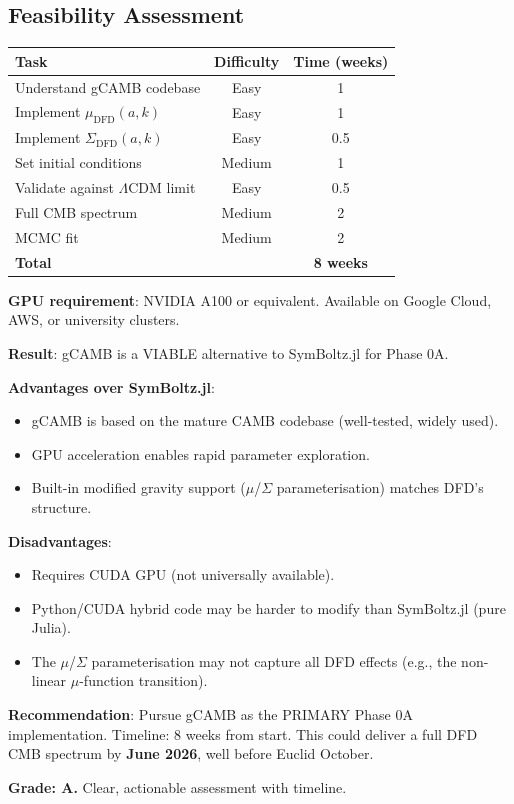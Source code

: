 \documentclass[11pt,a4paper]{article}
\begin{document}
\subsection{Feasibility Assessment}

\begin{center}
\begin{tabular}{lcc}
\toprule
\textbf{Task} & \textbf{Difficulty} & \textbf{Time (weeks)} \\
\midrule
Understand gCAMB codebase & Easy & 1 \\
Implement $\mu_{\mathrm{DFD}}(a,k)$ & Easy & 1 \\
Implement $\Sigma_{\mathrm{DFD}}(a,k)$ & Easy & 0.5 \\
Set initial conditions & Medium & 1 \\
Validate against $\Lambda$CDM limit & Easy & 0.5 \\
Full CMB spectrum & Medium & 2 \\
MCMC fit & Medium & 2 \\
\midrule
\textbf{Total} & & \textbf{8 weeks} \\
\bottomrule
\end{tabular}
\end{center}

\textbf{GPU requirement}: NVIDIA A100 or equivalent. Available on Google Cloud, AWS, or university clusters.

\begin{tcolorbox}[colback=green!5!white, colframe=green!60!black, title={Agent 16: gCAMB Assessment}]
\textbf{Result}: gCAMB is a VIABLE alternative to SymBoltz.jl for Phase 0A.

\textbf{Advantages over SymBoltz.jl}:
\begin{itemize}
\item gCAMB is based on the mature CAMB codebase (well-tested, widely used).
\item GPU acceleration enables rapid parameter exploration.
\item Built-in modified gravity support ($\mu$/$\Sigma$ parameterisation) matches DFD's structure.
\end{itemize}

\textbf{Disadvantages}:
\begin{itemize}
\item Requires CUDA GPU (not universally available).
\item Python/CUDA hybrid code may be harder to modify than SymBoltz.jl (pure Julia).
\item The $\mu$/$\Sigma$ parameterisation may not capture all DFD effects (e.g., the non-linear $\mu$-function transition).
\end{itemize}

\textbf{Recommendation}: Pursue gCAMB as the PRIMARY Phase 0A implementation. Timeline: 8 weeks from start. This could deliver a full DFD CMB spectrum by \textbf{June 2026}, well before Euclid October.

\textbf{Grade: A.} Clear, actionable assessment with timeline.
\end{tcolorbox}
\end{document}
